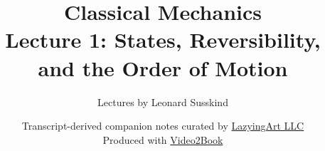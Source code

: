 \documentclass[11pt,oneside]{book}
\begin{document}
\hypersetup{pageanchor=false}
\frontmatter
\title{Classical Mechanics\\[0.45em]
\large Lecture 1: States, Reversibility, and the Order of Motion}
\author{Lectures by Leonard Susskind}
\date{Transcript-derived companion notes curated by
\href{https://lazying.art}{LazyingArt LLC}\\[0.35em]
\small Produced with
\href{https://github.com/lachlanchen/Video2Book}{Video2Book}}
\maketitle
\hypersetup{pageanchor=true}
\mainmatter

\end{document}
